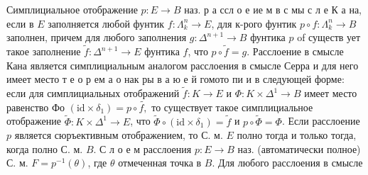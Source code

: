 \documentclass[10pt]{article}
\begin{document}
Симплициальное отображение $p: E \rightarrow B$ наз. р а ссл о е ие м в с мы с л е К а на, если в $E$ заполняется любой фунтик $f: \Lambda_{k}^{n} \rightarrow E$, для к-рого фунтик $p \circ f: \Lambda_{k}^{n} \rightarrow B$ заполнен, причем для любого заполнения $g: \Delta^{n+1} \rightarrow B$ фунтика $p$ of существ ует такое заполнение $\tilde{f}: \Delta^{n+1} \rightarrow E$ фунтика $f$, что $p \circ \tilde{f}=g$. Расслоение в смысле Кана является симплициальным аналогом расслоения в смысле Серра и для него имеет место т е о р ем а о нак ры в а ю е й гомото пи и в следующей форме: если для симплициальных отображений $\tilde{f}: K \rightarrow E$ и $\Phi: K \times \Delta^{1} \rightarrow B$ имеет место равенство Фо $\left(\mathrm{id} \times \delta_{1}\right)=p \circ \tilde{f,}$ то существует такое симплициальное отображение $\tilde{\Phi}: K \times \Delta^{1} \rightarrow E$, что $\tilde{\Phi} \circ\left(\mathrm{id} \times \delta_{1}\right)=\tilde{f}$ и $p \circ \tilde{\Phi}=\Phi$. Если расслоение $p$ является сюръективным отображением, то С. м. $E$ полно тогда и только тогда, когда полно С. м. $B$. С л о е м расслоения $p: E \rightarrow B$ наз. (автоматически полное) С. м. $F=p^{-1}(\theta)$, где $\theta$ отмеченная точка в $B$. Для любого расслоения в смысле
\end{document}
